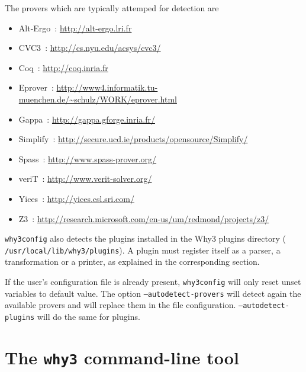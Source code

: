 The provers which are typically attemped for detection are
\begin{itemize}
\item Alt-Ergo~\cite{conchon08smt,ergo}: \url{http://alt-ergo.lri.fr}
\item CVC3~\cite{BarTin-CAV-07}: \url{http://cs.nyu.edu/acsys/cvc3/}
\item Coq~\cite{CoqArt}: \url{http://coq.inria.fr}
\item Eprover~\cite{schulz04ijcar}: \url{http://www4.informatik.tu-muenchen.de/~schulz/WORK/eprover.html}
\item Gappa~\cite{melquiond08rnc}: \url{http://gappa.gforge.inria.fr/}
\item Simplify~\cite{simplify05}: \url{http://secure.ucd.ie/products/opensource/Simplify/}
\item Spass~: \url{http://www.spass-prover.org/}
\item veriT~: \url{http://www.verit-solver.org/}
\item Yices~\cite{DM06}: \url{http://yices.csl.sri.com/}
\item Z3~\cite{z3}: \url{http://research.microsoft.com/en-us/um/redmond/projects/z3/}
\end{itemize}

\texttt{why3config} also detects the plugins installed in the Why3
plugins directory (\eg{} \texttt{/usr/local/lib/why3/plugins}). A
plugin must register itself as a parser, a transformation or a
printer, as explained in the corresponding section.

If the user's configuration file is already present,
\texttt{why3config} will only reset unset variables to default value.
The option \texttt{--autodetect-provers} will detect again the available
provers and will replace them in the file configuration.
\texttt{--autodetect-plugins} will do the same for plugins.

\section{The \texttt{why3} command-line tool}
\label{sec:why3ref}


